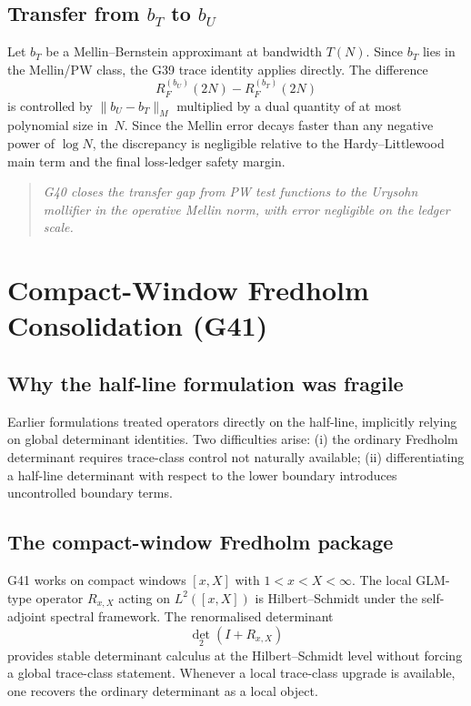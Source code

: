 \documentclass[11pt,a4paper]{article}
\begin{document}
\subsection{Transfer from $b_T$ to $b_U$}

Let $b_T$ be a Mellin--Bernstein approximant at bandwidth $T(N)$.  Since $b_T$ lies in the Mellin/PW class, the G39 trace identity applies directly.  The difference
\[
R_F^{(b_U)}(2N) - R_F^{(b_T)}(2N)
\]
is controlled by $\|b_U-b_T\|_M$ multiplied by a dual quantity of at most polynomial size in~$N$.  Since the Mellin error decays faster than any negative power of $\log N$, the discrepancy is negligible relative to the Hardy--Littlewood main term and the final loss-ledger safety margin.

\begin{quote}
\emph{G40 closes the transfer gap from PW test functions to the Urysohn mollifier in the operative Mellin norm, with error negligible on the ledger scale.}
\end{quote}

\section{Compact-Window Fredholm Consolidation (G41)}

\subsection{Why the half-line formulation was fragile}

Earlier formulations treated operators directly on the half-line, implicitly relying on global determinant identities.  Two difficulties arise: (i) the ordinary Fredholm determinant requires trace-class control not naturally available; (ii) differentiating a half-line determinant with respect to the lower boundary introduces uncontrolled boundary terms.

\subsection{The compact-window Fredholm package}

G41 works on compact windows $[x,X]$ with $1<x<X<\infty$.  The local GLM-type operator $R_{x,X}$ acting on $L^2([x,X])$ is Hilbert--Schmidt under the self-adjoint spectral framework.  The renormalised determinant
\[
\det_2(I + R_{x,X})
\]
provides stable determinant calculus at the Hilbert--Schmidt level without forcing a global trace-class statement.  Whenever a local trace-class upgrade is available, one recovers the ordinary determinant as a local object.
\end{document}
